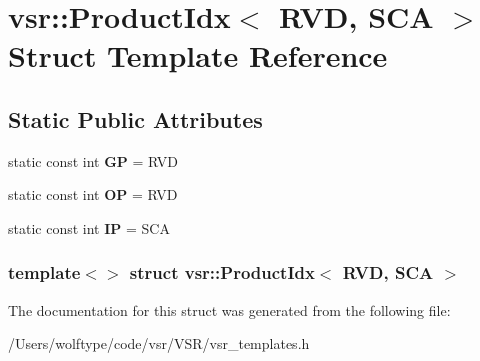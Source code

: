 \hypertarget{structvsr_1_1_product_idx_3_01_r_v_d_00_01_s_c_a_01_4}{\section{vsr\-:\-:Product\-Idx$<$ R\-V\-D, S\-C\-A $>$ Struct Template Reference}
\label{structvsr_1_1_product_idx_3_01_r_v_d_00_01_s_c_a_01_4}
}
\subsection*{Static Public Attributes}
\begin{DoxyCompactItemize}
\item 
\hypertarget{structvsr_1_1_product_idx_3_01_r_v_d_00_01_s_c_a_01_4_a1d97a4536c9cb6e5d092344f7d8ff84d}{static const int {\bfseries G\-P} = R\-V\-D}\label{structvsr_1_1_product_idx_3_01_r_v_d_00_01_s_c_a_01_4_a1d97a4536c9cb6e5d092344f7d8ff84d}

\item 
\hypertarget{structvsr_1_1_product_idx_3_01_r_v_d_00_01_s_c_a_01_4_a53e1ee515db76dc2230552dea5a9af67}{static const int {\bfseries O\-P} = R\-V\-D}\label{structvsr_1_1_product_idx_3_01_r_v_d_00_01_s_c_a_01_4_a53e1ee515db76dc2230552dea5a9af67}

\item 
\hypertarget{structvsr_1_1_product_idx_3_01_r_v_d_00_01_s_c_a_01_4_a78eb2e6ed8f1a0c6300d762841b437c3}{static const int {\bfseries I\-P} = S\-C\-A}\label{structvsr_1_1_product_idx_3_01_r_v_d_00_01_s_c_a_01_4_a78eb2e6ed8f1a0c6300d762841b437c3}

\end{DoxyCompactItemize}
\subsubsection*{template$<$$>$ struct vsr\-::\-Product\-Idx$<$ R\-V\-D, S\-C\-A $>$}



The documentation for this struct was generated from the following file\-:\begin{DoxyCompactItemize}
\item 
/\-Users/wolftype/code/vsr/\-V\-S\-R/vsr\-\_\-templates.\-h\end{DoxyCompactItemize}
